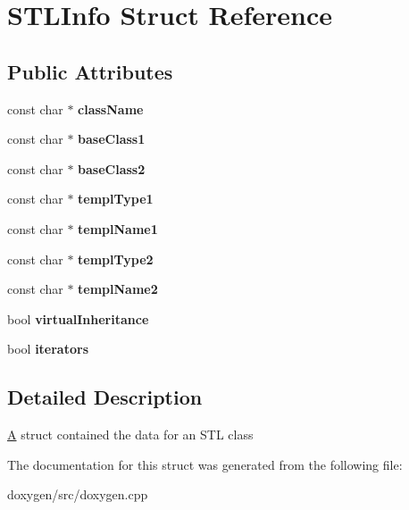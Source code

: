 \hypertarget{struct_s_t_l_info}{}\section{S\+T\+L\+Info Struct Reference}
\label{struct_s_t_l_info}
\subsection*{Public Attributes}
\begin{DoxyCompactItemize}
\item 
\mbox{\label{struct_s_t_l_info_af930326a1ad3b1eeb837db81e40d6f65}} 
const char $\ast$ {\bfseries class\+Name}
\item 
\mbox{\label{struct_s_t_l_info_a9a76f5f0f200d1e6b8ed433fbf1646ac}} 
const char $\ast$ {\bfseries base\+Class1}
\item 
\mbox{\label{struct_s_t_l_info_a29d4a02505eaeb6cdaf416c4018c1c94}} 
const char $\ast$ {\bfseries base\+Class2}
\item 
\mbox{\label{struct_s_t_l_info_a8f988e4df5b95c1083c0c45f2abac17e}} 
const char $\ast$ {\bfseries templ\+Type1}
\item 
\mbox{\label{struct_s_t_l_info_acdba5b83afb48d4d5419561d6332a23e}} 
const char $\ast$ {\bfseries templ\+Name1}
\item 
\mbox{\label{struct_s_t_l_info_a17ead4cbe08b8b7c09f32488b392b917}} 
const char $\ast$ {\bfseries templ\+Type2}
\item 
\mbox{\label{struct_s_t_l_info_a17fe8a04bb515e521c2f1f9eea74b311}} 
const char $\ast$ {\bfseries templ\+Name2}
\item 
\mbox{\label{struct_s_t_l_info_adf7de0dd37358cb2f21c913adab4e2bc}} 
bool {\bfseries virtual\+Inheritance}
\item 
\mbox{\label{struct_s_t_l_info_aa6a51c8426777163389453b971b338eb}} 
bool {\bfseries iterators}
\end{DoxyCompactItemize}


\subsection{Detailed Description}
\mbox{\hyperlink{class_a}{A}} struct contained the data for an S\+TL class 

The documentation for this struct was generated from the following file\+:\begin{DoxyCompactItemize}
\item 
doxygen/src/doxygen.\+cpp\end{DoxyCompactItemize}
